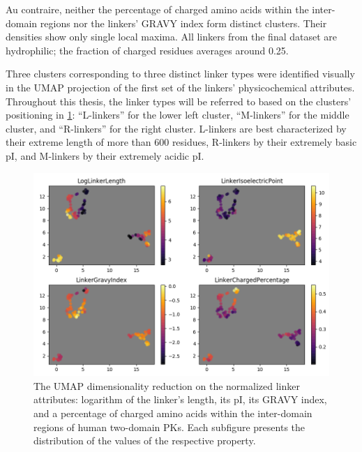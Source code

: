 		Au contraire, neither the percentage of charged amino acids within the inter-domain
		regions nor the linkers' GRAVY index form distinct clusters.
		Their densities show only single local maxima.
		All linkers from the final dataset are hydrophilic; the fraction of charged residues
		averages around 0.25.

	\label{res:first:umap}

		Three clusters corresponding to three distinct linker types were identified visually
		in the UMAP projection of the first set of the linkers' physicochemical attributes.
		Throughout this thesis, the linker types will be referred to based on the clusters'
		positioning in \cref{fig:umap}: ``L-linkers'' for the lower left cluster,
		``M-linkers'' for the middle cluster, and ``R-linkers'' for the right cluster.
		L-linkers are best characterized by their extreme length of more than 600 residues,
		R-linkers by their extremely basic pI, and M-linkers by their extremely acidic pI.

		\begin{figure}
			\centering
			\includegraphics[width=\linewidth]{img/linker_umap.png}
			\caption{The UMAP dimensionality reduction on the normalized linker attributes:
			logarithm of the linker's length, its pI, its GRAVY index, and
			a percentage of charged amino acids within the inter-domain regions of human
			two-domain PKs.
			Each subfigure presents the distribution of the values of the respective property.}
			\label{fig:umap}
		\end{figure}

